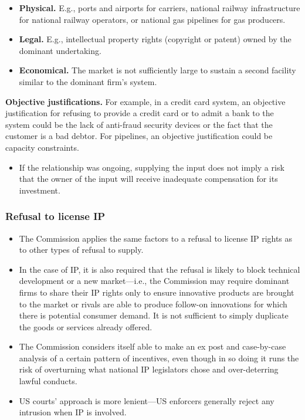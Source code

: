             \begin{itemize}
                \item \textbf{Physical.} E.g., ports and airports for carriers, national railway infrastructure for national railway operators, or national gas pipelines for gas producers.
                \item \textbf{Legal.} E.g., intellectual property rights (copyright or patent) owned by the dominant undertaking.
                \item \textbf{Economical.} The market is not sufficiently large to sustain a second facility similar to the dominant firm’s system.
            \end{itemize}
            
            \textbf{Objective justifications.} For example, in a credit card system, an objective justification for refusing to provide a credit card or to admit a bank to the system could be the lack of anti-fraud security devices or the fact that the customer is a bad debtor. For pipelines, an objective justification could be capacity constraints.
            
            \begin{itemize}
                \item If the relationship was ongoing, supplying the input does not imply a risk that the owner of the input will receive inadequate compensation for its investment.
            \end{itemize}

        \subsubsection{Refusal to license IP}

        \begin{itemize}
            \item The Commission applies the same factors to a refusal to license IP rights as to other types of refusal to supply.
            \item In the case of IP, it is also required that the refusal is likely to block technical development or a new market—i.e., the Commission may require dominant firms to share their IP rights only to ensure innovative products are brought to the market or rivals are able to produce follow-on innovations for which there is potential consumer demand. It is not sufficient to simply duplicate the goods or services already offered.
            \item The Commission considers itself able to make an ex post and case-by-case analysis of a certain pattern of incentives, even though in so doing it runs the risk of overturning what national IP legislators chose and over-deterring lawful conducts.
            \item US courts’ approach is more lenient—US enforcers generally reject any intrusion when IP is involved.
        \end{itemize}


